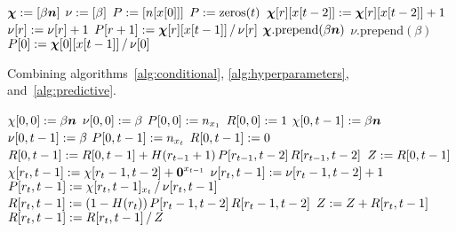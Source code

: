 \documentclass[10pt,english,oneside]{article}
\begin{document}
\begin{algorithm}[t]
\caption[]{}
  \begin{algorithmic}[0]
    \State {}
    \Statex
    \State $\boldsymbol{\chi} := [ \beta \boldsymbol{n} ]$
    \State $\nu := [\beta]$
    \State $P := [n[x[0]]]$
    \Statex
    \State {}
    \Statex
    \State $P := \textrm{zeros}(t)$
    \State $\boldsymbol{\chi}[r][x[t-2]] :=
    \boldsymbol{\chi}[r][x[t-2]] + 1$
    \State $\nu[r] := \nu[r] + 1$
    \State $P[r+1] := \boldsymbol{\chi}[r][x[t-1]] \,/\, \nu[r]$
    \EndFor
    \State $\boldsymbol{\chi}.\textrm{prepend}(\beta \boldsymbol{n})$
    \State $\nu.\textrm{prepend}(\beta)$
    \State $P[0] := \boldsymbol{\chi}[0][x[t-1]] \,/\, \nu[0]$
    \EndFor
  \end{algorithmic}
\end{algorithm}

\begin{algorithm}[t]
  \caption[]{Combining algorithms~\ref{alg:conditional},
    \ref{alg:hyperparameters}, and~\ref{alg:predictive}.}
  \label{alg:inference}
  \begin{algorithmic}[0]
    \State {}
    \Statex
    \State $\chi[0,0] := \beta \boldsymbol{n}$
    \State $\nu[0,0] := \beta$
    \State $P[0,0] := n_{x_1}$
    \State $R[0,0] := 1$
    \Statex
    \State {}
    \Statex
    \State $\chi[0,t-1] := \beta \boldsymbol{n}$
    \State $\nu[0,t-1] := \beta$
    \State $P[0,t-1] := n_{x_t}$
    \State $R[0,t-1] := 0$
    \State $R[0,t-1] := R[0,t-1] +
    H(r_{t-1}+1)\,P[r_{t-1},t-2]\,R[r_{t-1},t-2]$
    \EndFor
    \State $Z := R[0,t-1]$
    \State $\chi[r_t,t-1] := \chi[r_t-1,t-2] + \boldsymbol{0}^{x_{t-1}}$
    \State $\nu[r_t,t-1] := \nu[r_t-1,t-2] + 1$
    \State $P[r_t,t-1] := \chi[r_t, t-1]_{x_t} \,/\, \nu[r_t,t-1]$
    \State $R[r_t, t-1] := (1 - H(r_t))\,P[r_t-1,t-2]\,R[r_t-1, t-2]$
    \State $Z := Z + R[r_t,t-1]$
    \EndFor
    \Statex
    \State {}
    \Statex
    \State $R[r_t, t-1] := R[r_t, t-1] \,/\, Z$
    \EndFor
    \Statex
    \State {}
    \Statex
    \EndFor
  \end{algorithmic}
\end{algorithm}
\end{document}
